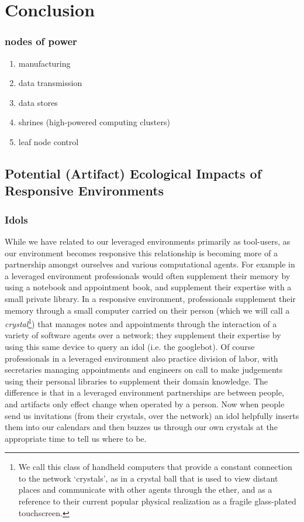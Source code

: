 \chapter{Conclusion}
\label{ch:conclusion}
%

\subsection{nodes of power}
        \begin{enumerate}
            \item manufacturing
            \item data transmission
            \item data stores
            \item shrines (high-powered computing clusters)
            \item leaf node control
        \end{enumerate}
        
        
\section{Potential (Artifact) Ecological Impacts of Responsive Environments}
\label{sec:ecological_impacts}
%
\subsection{Idols}
%
While we have related to our leveraged environments primarily as tool-users, as our environment becomes responsive this relationship is becoming more of a partnership amongst ourselves and various computational agents. 
For example in a leveraged environment professionals would often supplement their memory by using a notebook and appointment book, and supplement their expertise with a small private library. 
In a responsive environment, professionals supplement their memory through a small computer carried on their person (which we will call a \emph{crystal}\footnote{We call this class of handheld computers that provide a constant connection to the network `crystals', as in a crystal ball that is used to view distant places and communicate with other agents through the ether, and as a reference to their current popular physical realization as a fragile glass-plated touchscreen.}) that manages notes and appointments through the interaction of a variety of software agents over a network; they supplement their expertise by using this same device to query an idol (i.e. the googlebot).
Of course professionals in a leveraged environment also practice division of labor, with secretaries managing appointments and engineers on call to make judgements using their personal libraries to supplement their domain knowledge.
The difference is that in a leveraged environment partnerships are between people, and artifacts only effect change when operated by a person.
Now when people send us invitations (from their crystals, over the network) an idol helpfully inserts them into our calendars and then buzzes us through our own crystals at the appropriate time to tell us where to be.

